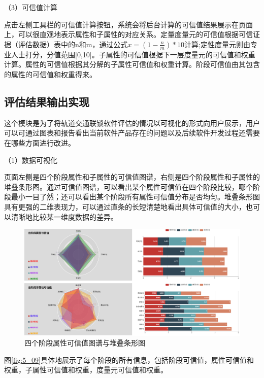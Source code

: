 （3）可信值计算

点击左侧工具栏的可信值计算按钮，系统会将后台计算的可信值结果展示在页面上，可以很直观地表示属性和子属性的对应关系。定量度量元的可信值根据可信证据（评估数据）表中的n和m，通过公式$x=(1-\frac{n}{m})*10$计算;定性度量元则由专业人士打分，分值范围[0,10]。子属性的可信值根据下一层度量元的可信值和权重计算。属性的可信值根据其分解的子属性可信值和权重计算。阶段可信值由其包含的属性的可信值和权重得来。




\subsection{评估结果输出实现}
这个模块是为了将轨道交通联锁软件评估的情况以可视化的形式向用户展示，用户可以可通过图表和报告看出当前软件产品存在的问题以及后续软件开发过程还需要在哪些方面进行改进。

（1）数据可视化

页面左侧是四个阶段属性和子属性的可信值图谱，右侧是四个阶段属性和子属性的堆叠条形图。通过可信值图谱，可以看出某个属性可信值在四个阶段比较，哪个阶段最小一目了然；还可以看出某个阶段所有属性可信值分布是否均匀。堆叠条形图具有更强的二维表现力，可以通过直条的长短清楚地看出具体可信值的大小，也可以清晰地比较某一维度数据的差异。
\begin{figure}[htb]
	\centering
	\includegraphics[width=13cm]{fig/5_08.png}
	\caption{四个阶段属性可信值图谱与堆叠条形图}
	\label{fig:5_08}
\end{figure}

图\ref{fig:5_09}具体地展示了每个阶段的所有信息，包括阶段可信值，属性可信值和权重，子属性可信值和权重，度量元可信值和权重。

